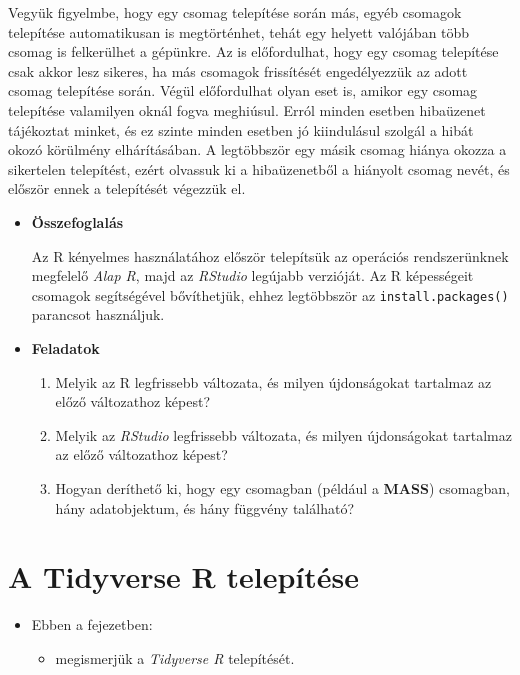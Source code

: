 \documentclass[
]{book}
\providecommand{\tightlist}{%
  \setlength{\itemsep}{0pt}\setlength{\parskip}{0pt}}
\newenvironment{rmdblock}[1]
  {\begin{shaded*}
  \begin{itemize}
  \renewcommand{\labelitemi}{
    \raisebox{-.7\height}[0pt][0pt]{
      {\setkeys{Gin}{width=3em,keepaspectratio}\texttt{[image: images/\#1]}}
    }
  }
  \item
  }
  {
  \end{itemize}
  \end{shaded*}
  }
\newenvironment{rmdlevel2}
  {\begin{rmdblock}{level2}}
  {\end{rmdblock}}
\newenvironment{rmdsummary}
  {\begin{rmdblock}{summary}}
  {\end{rmdblock}}
\newenvironment{rmdexercise}
  {\begin{rmdblock}{exercise}}
  {\end{rmdblock}}
\begin{document}
Vegyük figyelmbe, hogy egy csomag telepítése során más, egyéb csomagok telepítése automatikusan is megtörténhet, tehát egy helyett valójában több csomag is felkerülhet a gépünkre. Az is előfordulhat, hogy egy csomag telepítése csak akkor lesz sikeres, ha más csomagok frissítését engedélyezzük az adott csomag telepítése során. Végül előfordulhat olyan eset is, amikor egy csomag telepítése valamilyen oknál fogva meghiúsul. Erról minden esetben hibaüzenet tájékoztat minket, és ez szinte minden esetben jó kiindulásul szolgál a hibát okozó körülmény elhárításában. A legtöbbször egy másik csomag hiánya okozza a sikertelen telepítést, ezért olvassuk ki a hibaüzenetből a hiányolt csomag nevét, és először ennek a telepítését végezzük el.

\begin{rmdsummary}
\textbf{Összefoglalás}

Az R kényelmes használatához először telepítsük az operációs
rendszerünknek megfelelő \emph{Alap R}, majd az \emph{RStudio} legújabb
verzióját. Az R képességeit csomagok segítségével bővíthetjük, ehhez
legtöbbször az \texttt{install.packages()} parancsot használjuk.
\end{rmdsummary}

\begin{rmdexercise}
\textbf{Feladatok}

\begin{enumerate}
\def\labelenumi{\arabic{enumi}.}
\tightlist
\item
  Melyik az R legfrissebb változata, és milyen újdonságokat tartalmaz az előző változathoz képest?
\item
  Melyik az \emph{RStudio} legfrissebb változata, és milyen újdonságokat tartalmaz az előző változathoz képest?
\item
  Hogyan deríthető ki, hogy egy csomagban (például a \textbf{MASS}) csomagban, hány adatobjektum, és hány függvény található?
\end{enumerate}
\end{rmdexercise}

\hypertarget{a-tidyverse-r-telepuxedtuxe9se}{%
\section{A Tidyverse R telepítése}\label{a-tidyverse-r-telepuxedtuxe9se}}

\begin{rmdlevel2}
Ebben a fejezetben:

\begin{itemize}
\tightlist
\item
  megismerjük a \emph{Tidyverse R} telepítését.
\end{itemize}
\end{rmdlevel2}
\end{document}
